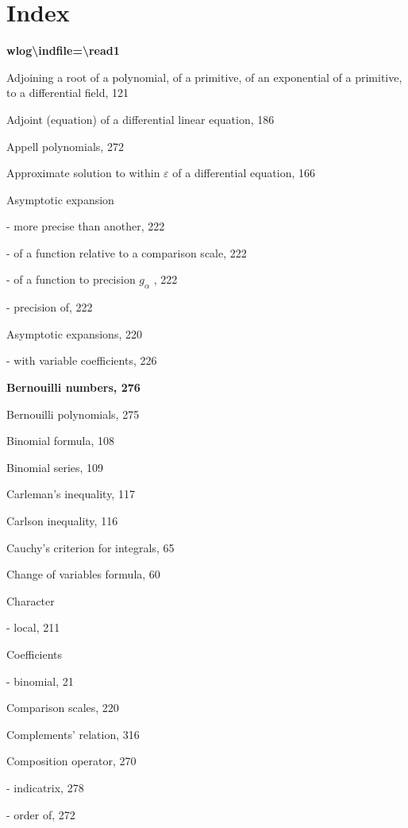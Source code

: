 \chapter*{Index}
{}

\par\noindent\textbf{\texorpdfstring{wlog\textbackslash indfile=\textbackslash read1}{wlog=}}\par

Adjoining a root of a polynomial, of a primitive, of an exponential of a primitive, to a differential field, 121

Adjoint (equation) of a differential linear equation, 186

Appell polynomials, 272

Approximate solution to within \(\varepsilon\) of a differential equation, 166

Asymptotic expansion

- more precise than another, 222

- of a function relative to a comparison scale, 222

- of a function to precision \(g_{\alpha}\) , 222

- precision of, 222

Asymptotic expansions, 220

- with variable coefficients, 226

\par\noindent\textbf{Bernouilli numbers, 276}\par

Bernouilli polynomials, 275

Binomial formula, 108

Binomial series, 109

Carleman's inequality, 117

Carlson inequality, 116

Cauchy's criterion for integrals, 65

Change of variables formula, 60

Character

- local, 211

Coefficients

- binomial, 21

Comparison scales, 220

Complements' relation, 316

Composition operator, 270

- indicatrix, 278

- order of, 272

